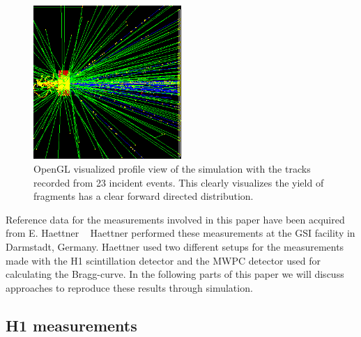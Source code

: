 \begin{figure}[h] 
\begin{center}
\includegraphics[width=0.5\textwidth]{images/twentyEvents.png}  
\caption{\label{fig:twentyEvents} OpenGL visualized profile view of the simulation with the tracks recorded from 23 incident events. This clearly visualizes the yield of fragments has a clear forward directed distribution.}
\end{center}
\end{figure}

Reference data for the measurements involved in this paper have been acquired from E. Haettner ~\cite{ehaettner}  Haettner performed these measurements at the GSI facility in Darmstadt, Germany. Haettner used two different setups for the measurements made with the H1 scintillation detector and the MWPC detector used for calculating the Bragg-curve. In the following parts of this paper we will discuss approaches to reproduce these results through simulation. %

\subsection{H1 measurements}


